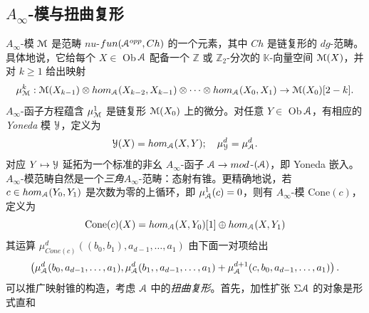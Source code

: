 \documentclass[11pt,a4paper]{article}
\numberwithin{equation}{section}
\newcommand{\bZ}{\mathbb{Z}}
\newcommand{\bK}{\mathbb{K}}
\newcommand{\scrA}{\EuScript{A}}
\newcommand{\scrY}{\EuScript{Y}}
\newcommand{\scrM}{\EuScript{M}}
\begin{document}
\subsection{$A_{\infty}$-模与扭曲复形}

$A_{\infty}$-模 $\scrM$ 是范畴 $nu$-$fun(\scrA^{opp},Ch)$ 的一个元素，其中 $Ch$ 是链复形的 $dg$-范畴。具体地说，它给每个 $X\in$ Ob$\,\scrA$ 配备一个 $\bZ$ 或 $\bZ_2$-分次的 $\bK$-向量空间 $\scrM(X)$，并对 $k\geq 1$ 给出映射
\[
\mu_{\scrM}^k: \scrM(X_{k-1}) \otimes hom_{\scrA}(X_{k-2},X_{k-1}) \otimes \cdots \otimes hom_{\scrA}(X_0,X_1) \rightarrow \scrM(X_0)[2-k].
\]
$A_{\infty}$-函子方程蕴含 $\mu_{\scrM}^1$ 是链复形 $\scrM(X_0)$ 上的微分。对任意 $Y \in$ Ob$\,\scrA$，有相应的 \emph{Yoneda} 模 $\scrY$，定义为
\[
\scrY(X) = hom_{\scrA}(X,Y); \quad \mu_{\scrY}^d = \mu_{\scrA}^d.
\]
对应 $Y \mapsto \scrY$ 延拓为一个标准的非幺 $A_{\infty}$-函子 $\scrA \rightarrow mod$-$(\scrA)$，即 Yoneda 嵌入。$A_{\infty}$-模范畴自然是一个\emph{三角}$A_{\infty}$-范畴：态射有锥。更精确地说，若 $c\in hom_{\scrA}(Y_0,Y_1)$ 是次数为零的上循环，即 $\mu^1_{\scrA}(c)=0$，则有 $A_{\infty}$-模 Cone$(c)$，定义为
\begin{equation}\label{eqn:cone}
\mathrm{Cone}(c)(X) = hom_{\scrA}(X,Y_0)[1] \oplus hom_{\scrA}(X,Y_1)
\end{equation}
其运算 $\mu^d_{Cone(c)}((b_0,b_1),a_{d-1},\ldots,a_1)$ 由下面一对项给出
\[
\left(\mu_{\scrA}^d(b_0,a_{d-1},\ldots,a_1), \mu_{\scrA}^d(b_1,,a_{d-1},\ldots,a_1)+ \mu_{\scrA}^{d+1}(c,b_0,a_{d-1},\ldots,a_1) \right).
\]
可以推广映射锥的构造，考虑 $\scrA$ 中的\emph{扭曲复形}。首先，加性扩张 $\Sigma\scrA$ 的对象是形式直和
\end{document}
